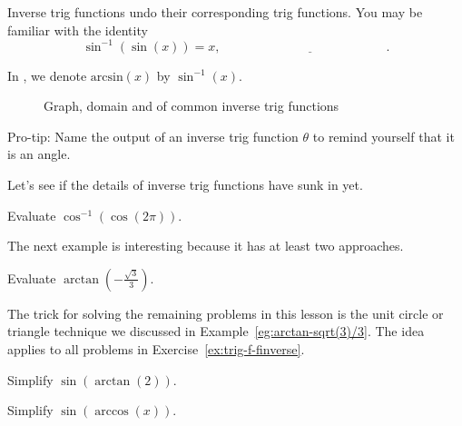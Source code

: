 \documentclass[../main.tex]{subfiles}
\begin{document}
Inverse trig functions undo their corresponding trig functions. You may be familiar with the identity
\[
  \sin^{-1}(\sin(x)) = x, \quad \underline{\hspace{2in}}.
\]

\faExclamationTriangle{} In \thiscourse{}, we denote \(\mathrm{arcsin}(x)\) by \(\sin^{-1}(x)\).

\blanks*


\begin{figure}[H]
  \centering
  
  \quad
  
  \quad
  

  \caption{Graph, domain and  of common inverse trig functions}
\end{figure}
Pro-tip: Name the output of an inverse trig function \(\theta\) to remind yourself that it is an angle.
\clearpage

Let's see if the details of inverse trig functions have sunk in yet.

\begin{example} \label{eg:arccos-cos-caution}
  Evaluate \(\cos^{-1}(\cos(2\pi))\).

\end{example}

The next example is interesting because it has at least two approaches.
\begin{example} \label{eg:arctan-sqrt(3)/3}
  Evaluate \(\arctan\left(-\frac{\sqrt{3}}{3}\right)\).

  \blanks*
\end{example}
\clearpage

The trick for solving the remaining problems in this lesson is the unit circle or triangle technique we discussed in Example~\ref{eg:arctan-sqrt(3)/3}. The idea applies to all problems in Exercise~\ref{ex:trig-f-finverse}.

\begin{example} \label{eg:trig-sin-arctan}
  Simplify \(\sin(\arctan(2))\).

\end{example}

\begin{exercise} \label{ex:trig-sin-arccos}
  Simplify \(\sin(\arccos(x))\).

\end{exercise}
\clearpage
\end{document}
